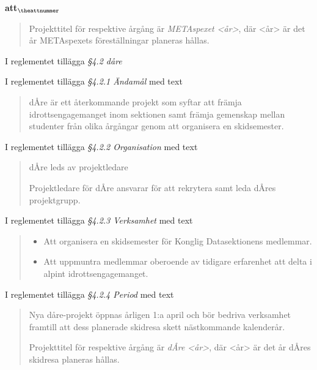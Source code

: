 \documentclass[a4paper]{article}
\begin{document}
\begin{list}{\bf att$_{\theattnummer}$}{}
\begin{quote}
        Projekttitel för respektive årgång är \textit{METAspexet <år>}, där <år> är det år METAspexets föreställningar planeras hållas.
    \end{quote}


\item I reglementet tillägga \textit{\S4.2 dåre}
\item I reglementet tillägga \textit{\S4.2.1 Ändamål} med text
    \begin{quote}
        dÅre är ett återkommande projekt som syftar att främja idrottsengagemanget inom sektionen samt främja gemenskap mellan studenter från olika årgångar genom att organisera en skidsemester.
    \end{quote}
\item I reglementet tillägga \textit{\S4.2.2 Organisation} med text
    \begin{quote}
        dÅre leds av projektledare

        Projektledare för dÅre ansvarar för att rekrytera samt leda dÅres projektgrupp.
    \end{quote}
\item I reglementet tillägga \textit{\S4.2.3 Verksamhet} med text
    \begin{quote}
        \begin{itemize}
            \item Att organisera en skidsemester för Konglig Datasektionens medlemmar.
            \item Att uppmuntra medlemmar oberoende av tidigare erfarenhet att delta i alpint idrottsengagemanget.
        \end{itemize}
    \end{quote}
\item I reglementet tillägga \textit{\S4.2.4 Period} med text
    \begin{quote}
        Nya dåre-projekt öppnas årligen 1:a april och bör bedriva verksamhet framtill att dess planerade skidresa skett nästkommande kalenderår.

        Projekttitel för respektive årgång är \textit{dÅre <år>}, där <år> är det år dÅres skidresa planeras hållas.
    \end{quote}



\end{list}
\end{document}

